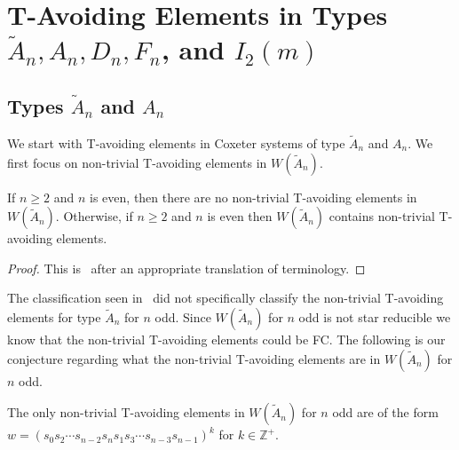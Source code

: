 \chapter{T-Avoiding Elements in Types $\widetilde{A}_n, A_n, D_n, F_n$, and $I_2(m)$}\label{chap:TandTavoid}


\section{Types $\widetilde{A}_n$ and $A_n$}
We start with T-avoiding elements in Coxeter systems of type $\widetilde{A}_n$ and $A_n$. We first focus on non-trivial T-avoiding elements in $W(\widetilde{A}_n)$.

\begin{theorem}
 If $n \geq 2$ and $n$ is even, then there are no non-trivial T-avoiding elements in $W(\widetilde{A}_n)$. Otherwise, if $n \geq 2$ and $n$ is even then $W(\widetilde{A}_n)$ contains non-trivial T-avoiding elements.
\begin{proof}
	This is~\cite[Proposition~3.1.2.]{Fan1999} after an appropriate translation of terminology.
\end{proof}
\end{theorem}



The classification seen in~\cite{Fan1999} did not specifically classify the non-trivial T-avoiding elements for type $\widetilde{A}_n$ for $n$ odd. Since $W(\widetilde{A}_n)$ for $n$ odd is not star reducible we know that the non-trivial T-avoiding elements could be FC. The following is our conjecture regarding what the non-trivial T-avoiding elements are in $W(\widetilde{A}_n)$ for $n$ odd.
\begin{conjecture}
	The only non-trivial T-avoiding elements in $W(\widetilde{A}_n)$ for $n$ odd are of the form $w=(s_0s_2 \cdots s_{n-2}s_ns_1s_3 \cdots s_{n-3}s_{n-1})^k$  for $k \in \mathbb{Z}^+$. 
\end{conjecture} 

